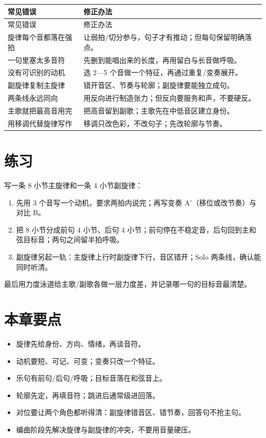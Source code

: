 \begin{longtable}{p{}p{}}
\toprule
常见错误 & 修正办法 \\
\midrule
\endfirsthead
\toprule
常见错误 & 修正办法 \\
\midrule
\endhead
旋律每个音都落在强拍 & 让弱拍/切分参与，句子才有推动；但每句保留明确落点。 \\
一句里塞太多音符 & 先删到能唱出来的长度，再用留白与长音做呼吸。 \\
没有可识别的动机 & 选 2—5 个音做一个特征，再通过重复/变奏展开。 \\
副旋律复制主旋律 & 错开音区、节奏与轮廓；副旋律要能独立成句。 \\
两条线永远同向 & 用反向进行制造张力；但反向要服务和声，不要硬反。 \\
主歌就把最高音用完 & 把高音留到副歌；主歌先在中低音区建立身份。 \\
用移调代替旋律写作 & 移调只改色彩，不改句子；先改轮廓与节奏。 \\
\bottomrule
\end{longtable}

\section{练习}
\label{sec:melody-exercise}

\begin{exercise}
写一条 8 小节主旋律和一条 4 小节副旋律：
\begin{enumerate}
\item 先用 3 个音写一个动机，要求两拍内说完；再写变奏 A'（移位或改节奏）与对比 B。
\item 把 8 小节分成前句 4 小节、后句 4 小节；前句停在不稳定音，后句回到主和弦目标音；两句之间留半拍呼吸。
\item 副旋律另起一轨：主旋律上行时副旋律下行，音区错开；Solo 两条线，确认能同时听清。
\end{enumerate}
最后用力度泳道给主歌/副歌各做一层力度差，并记录哪一句的目标音最清楚。
\end{exercise}

\section{本章要点}
\label{sec:melody-takeaways}

\begin{itemize}
\item 旋律先给身份、方向、情绪，再谈音符。
\item 动机要短、可记、可变；变奏只改一个特征。
\item 乐句有前句/后句/呼吸；目标音落在和弦音上。
\item 轮廓先定，再填音符；跳进后通常级进回落。
\item 对位要让两个角色都听得清：副旋律错音区、错节奏，回答句不抢主句。
\item 编曲阶段先解决旋律与副旋律的冲突，不要用音量硬压。
\end{itemize}

